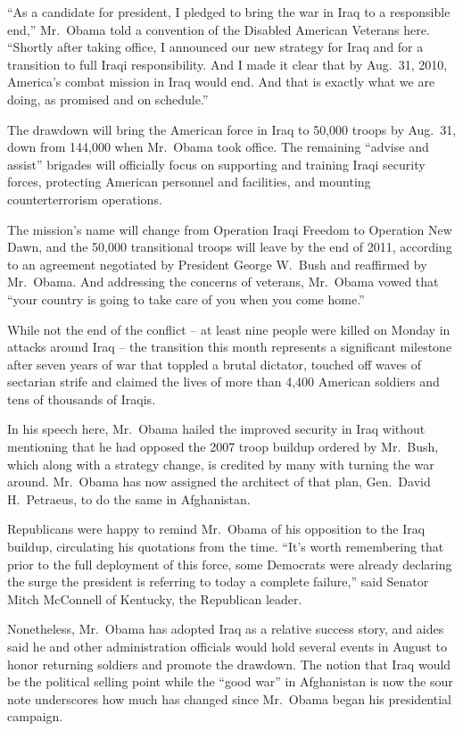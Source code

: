 ﻿\documentclass[12pt]{article}
\begin{document}
``As a candidate for president, I pledged to bring the war in Iraq to a responsible end,'' Mr.~Obama
told a convention of the Disabled American Veterans here. ``Shortly after taking office, I announced
our new strategy for Iraq and for a transition to full Iraqi responsibility. And I made it clear
that by Aug.~31, 2010, America's combat mission in Iraq would end. And that is exactly what we are
doing, as promised and on schedule.''

The drawdown will bring the American force in Iraq to 50,000 troops by Aug.~31, down from 144,000
when Mr.~Obama took office. The remaining ``advise and assist'' brigades will officially focus on
supporting and training Iraqi security forces, protecting American personnel and facilities, and
mounting counterterrorism operations.

The mission's name will change from Operation Iraqi Freedom to Operation New Dawn, and the 50,000
transitional troops will leave by the end of 2011, according to an agreement negotiated by President
George W.~Bush and reaffirmed by Mr.~Obama. And addressing the concerns of veterans, Mr.~Obama vowed
that ``your country is going to take care of you when you come home.''

While not the end of the conflict -- at least nine people were killed on Monday in attacks around
Iraq -- the transition this month represents a significant milestone after seven years of war that
toppled a brutal dictator, touched off waves of sectarian strife and claimed the lives of more than
4,400 American soldiers and tens of thousands of Iraqis.

In his speech here, Mr.~Obama hailed the improved security in Iraq without mentioning that he had
opposed the 2007 troop buildup ordered by Mr.~Bush, which along with a strategy change, is credited
by many with turning the war around. Mr.~Obama has now assigned the architect of that plan,
Gen.~David H.~Petraeus, to do the same in Afghanistan.

Republicans were happy to remind Mr.~Obama of his opposition to the Iraq buildup, circulating his
quotations from the time. ``It's worth remembering that prior to the full deployment of this force,
some Democrats were already declaring the surge the president is referring to today a complete
failure,'' said Senator Mitch McConnell of Kentucky, the Republican leader.

Nonetheless, Mr.~Obama has adopted Iraq as a relative success story, and aides said he and other
administration officials would hold several events in August to honor returning soldiers and promote
the drawdown. The notion that Iraq would be the political selling point while the ``good war'' in
Afghanistan is now the sour note underscores how much has changed since Mr.~Obama began his
presidential campaign.
\end{document}

